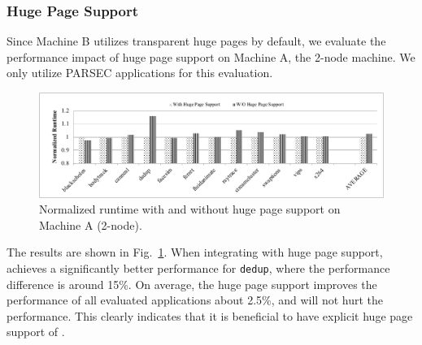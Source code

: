 \subsubsection{Huge Page Support} 
\label{sec:hugepage}

Since Machine B utilizes transparent huge pages by default, we evaluate the performance impact of huge page support on Machine A, the 2-node machine. We only utilize PARSEC applications for this evaluation. 

\begin{figure}[!h]
    \centering
    \includegraphics[width=\textwidth]{figure/hugepage.pdf}
    \caption{Normalized runtime with and without huge page support on Machine A (2-node).}
    \label{fig:hugepage}
\end{figure}

The results are shown in Fig.~\ref{fig:hugepage}. When integrating with huge page support, \NM{} achieves a significantly better performance for \texttt{dedup}, where the performance difference is around 15\%. On average, the huge page support improves the performance of all evaluated applications about 2.5\%, and will not hurt the performance. This clearly indicates that it is beneficial to have explicit huge page support of \NM{}.  


